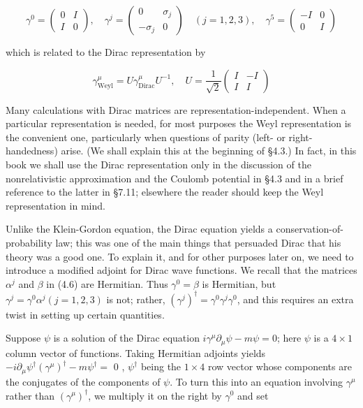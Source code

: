 \documentclass[10pt, letterpaper]{article}
\begin{document}
$$
\gamma^{0}=\left(\begin{array}{cc}
0 & I \\
I & 0
\end{array}\right), \quad \gamma^{j}=\left(\begin{array}{cc}
0 & \sigma_{j} \\
-\sigma_{j} & 0
\end{array}\right) \quad(j=1,2,3), \quad \gamma^{5}=\left(\begin{array}{cc}
-I & 0 \\
0 & I
\end{array}\right)
$$

which is related to the Dirac representation by

$$
\gamma_{\mathrm{Weyl}}^{\mu}=U \gamma_{\mathrm{Dirac}}^{\mu} U^{-1}, \quad U=\frac{1}{\sqrt{2}}\left(\begin{array}{cc}
I & -I \\
I & I
\end{array}\right)
$$

Many calculations with Dirac matrices are representation-independent. When a particular representation is needed, for most purposes the Weyl representation is the convenient one, particularly when questions of parity (left- or right-handedness) arise. (We shall explain this at the beginning of §4.3.) In fact, in this book we shall use the Dirac representation only in the discussion of the nonrelativistic approximation and the Coulomb potential in §4.3 and in a brief reference to the latter in §7.11; elsewhere the reader should keep the Weyl representation in mind.

Unlike the Klein-Gordon equation, the Dirac equation yields a conservation-of-probability law; this was one of the main things that persuaded Dirac that his theory was a good one. To explain it, and for other purposes later on, we need to introduce a modified adjoint for Dirac wave functions. We recall that the matrices $\alpha^{j}$ and $\beta$ in (4.6) are Hermitian. Thus $\gamma^{0}=\beta$ is Hermitian, but $\gamma^{j}=\gamma^{0} \alpha^{j} (j=1,2,3)$ is not; rather, $\left(\gamma^{j}\right)^{\dagger}=\gamma^{0} \gamma^{j} \gamma^{0}$, and this requires an extra twist in setting up certain quantities.

Suppose $\psi$ is a solution of the Dirac equation $i \gamma^{\mu} \partial_{\mu} \psi-m \psi=0$; here $\psi$ is a $4 \times 1$ column vector of functions. Taking Hermitian adjoints yields $-i \partial_{\mu} \psi^{\dagger}\left(\gamma^{\mu}\right)^{\dagger}-m \psi^{\dagger}=$ 0 , $\psi^{\dagger}$ being the $1 \times 4$ row vector whose components are the conjugates of the components of $\psi$. To turn this into an equation involving $\gamma^{\mu}$ rather than $\left(\gamma^{\mu}\right)^{\dagger}$, we multiply it on the right by $\gamma^{0}$ and set
\end{document}
